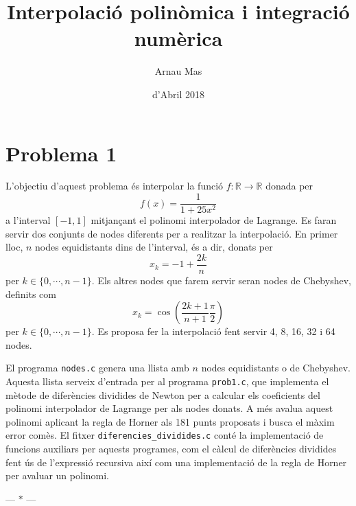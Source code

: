\documentclass[12pt]{article}
\title{\sffamily {\bfseries Pràctica 3:} Interpolació polinòmica i integració numèrica}
\author{\sffamily Arnau Mas}
\date{\sffamily 24 d'Abril 2018}
\numberwithin{table}{section}
\numberwithin{figure}{section}
\numberwithin{equation}{section}
\newcommand{\R}{\mathbb{R}}
\newcommand{\parbreak}{
	\begin{center}
		--- $\ast$ ---
	\end{center} 
}
\begin{document}
\maketitle

\section{Problema 1} \label{sec:Problema 1}
L'objectiu d'aquest problema és interpolar la funció \( f \colon \R \to \R \) donada per
\begin{equation*}
	f(x) = \frac{1}{1 + 25x^2}
\end{equation*}
a l'interval \( [-1,1] \) mitjançant el polinomi interpolador de Lagrange. Es faran servir dos conjunts de nodes diferents per a realitzar la interpolació. En primer lloc, \( n \) nodes equidistants dins de l'interval, és a dir, donats per
\begin{equation*}
	x_k = -1 + \frac{2k}{n}
\end{equation*}
per \( k \in \{0, \cdots, n-1\} \). Els altres nodes que farem servir seran nodes de Chebyshev, definits com
\begin{equation*}
	x_k = \cos{\left(\frac{2k+1}{n+1} \frac{\pi}{2}\right)}
\end{equation*}
per \( k \in \{0, \cdots, n-1\} \). Es proposa fer la interpolació fent servir 4, 8, 16, 32 i 64 nodes. 

El programa \texttt{nodes.c} genera una llista amb \( n \) nodes equidistants o de Chebyshev. Aquesta llista serveix d'entrada per al programa \texttt{prob1.c}, que implementa el mètode de diferències dividides de Newton per a calcular els coeficients del polinomi interpolador de Lagrange per als nodes donats. A més avalua aquest polinomi aplicant la regla de Horner als 181 punts proposats i busca el màxim error comès. El fitxer \texttt{diferencies\_dividides.c} conté la implementació de funcions auxiliars per aquests programes, com el càlcul de diferències dividides fent ús de l'expressió recursiva així com una implementació de la regla de Horner per avaluar un polinomi. 

\parbreak
\end{document}
